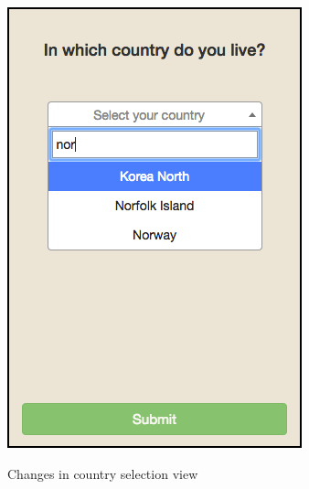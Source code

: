 \begin{figure}[H]
{        \includegraphics[scale=0.34]{pics/survey/country2}
      }
      \caption{Changes in country selection view}
      \label{fig:change-country}
    \end{figure}

